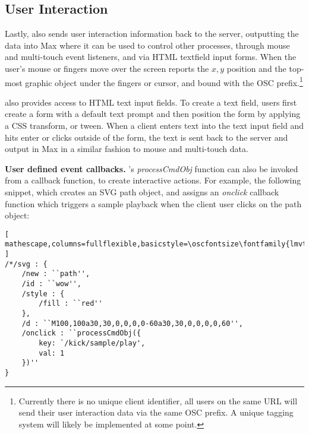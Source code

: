 \subsection{User Interaction}\label{sec:interaction}
Lastly, \drawsocket also sends user interaction information back to the server, outputting the data into Max where it can be used to control other processes, through mouse and multi-touch event listeners, and via HTML textfield input forms.
When the user's mouse or fingers move over the screen \drawsocket reports the $x,y$ position and the top-most graphic object under the fingers or cursor, and bound with the OSC prefix.\footnote{Currently there is no unique client identifier, all users on the same URL will send their user interaction data via the same OSC prefix. A unique tagging system will likely be implemented at some point.}

\drawsocket also provides access to HTML text input fields. To create a text field, users first create a form with a default text prompt and then position the form by applying a CSS transform, or tween. When a client enters text into the text input field and hits enter or clicks outside of the form, the text is sent back to the server and output in Max in a similar fashion to mouse and multi-touch data.

\medskip
\noindent
\textbf{User defined event callbacks.}
\drawsocket's \textit{processCmdObj} function can also be invoked from a callback function, to create interactive actions. For example, the following snippet, which creates an SVG path object, and assigns an \textit{onclick} callback function which triggers a sample playback when the client user clicks on the path object:

\begin{lstlisting}[ mathescape,columns=fullflexible,basicstyle=\oscfontsize\fontfamily{lmvtt}\selectfont ]
/*/svg : {
    /new : ``path'',
    /id : ``wow'',
    /style : {
	    /fill : ``red''
    },
    /d : ``M100,100a30,30,0,0,0,0-60a30,30,0,0,0,0,60'',
    /onclick : ``processCmdObj({
        key: `/kick/sample/play',
        val: 1
    })''
}
\end{lstlisting}





%
%
%
%
%
%
